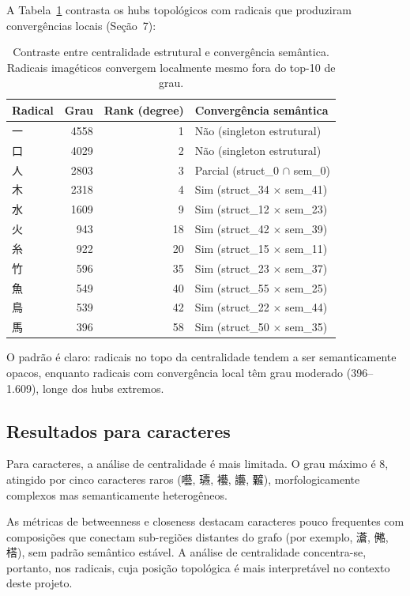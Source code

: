 \documentclass[10pt, a4paper, titlepage]{extarticle}
\begin{document}
A Tabela~\ref{tab:centralidade-convergentes} contrasta os hubs topológicos com radicais que produziram convergências locais (Seção~7):

\begin{table}[H]
\centering
\small
\renewcommand{\arraystretch}{1.15}
\begin{tabular}{lrrl}
\toprule
\textbf{Radical} & \textbf{Grau} & \textbf{Rank (degree)} &
\textbf{Convergência semântica} \\
\midrule
一  & 4558 & 1  & Não (singleton estrutural) \\
口  & 4029 & 2  & Não (singleton estrutural) \\
人  & 2803 & 3  & Parcial (struct\_0 $\cap$ sem\_0) \\
木  & 2318 & 4  & Sim (struct\_34 $\times$ sem\_41) \\
水  & 1609 & 9  & Sim (struct\_12 $\times$ sem\_23) \\
火  &  943 & 18 & Sim (struct\_42 $\times$ sem\_39) \\
糸  &  922 & 20 & Sim (struct\_15 $\times$ sem\_11) \\
竹  &  596 & 35 & Sim (struct\_23 $\times$ sem\_37) \\
魚  &  549 & 40 & Sim (struct\_55 $\times$ sem\_25) \\
鳥  &  539 & 42 & Sim (struct\_22 $\times$ sem\_44) \\
馬  &  396 & 58 & Sim (struct\_50 $\times$ sem\_35) \\
\bottomrule
\end{tabular}
\caption{Contraste entre centralidade estrutural e convergência
semântica. Radicais imagéticos convergem localmente mesmo fora do
top-10 de grau.}
\label{tab:centralidade-convergentes}
\end{table}

O padrão é claro: radicais no topo da centralidade tendem a ser semanticamente opacos, enquanto radicais com convergência local têm grau moderado (396--1.609), longe dos hubs extremos.

\subsection{Resultados para caracteres}
Para caracteres, a análise de centralidade é mais limitada. O grau máximo é 8, atingido por cinco caracteres raros (囈, 瓙, 襼, 讛, 䊲), morfologicamente complexos mas semanticamente heterogêneos.

As métricas de betweenness e closeness destacam caracteres pouco frequentes com composições que conectam sub-regiões distantes do grafo (por exemplo, 濸, 鿚, 榙), sem padrão semântico estável. A análise de centralidade concentra-se, portanto, nos radicais, cuja posição topológica é mais interpretável no contexto deste projeto.
\end{document}
